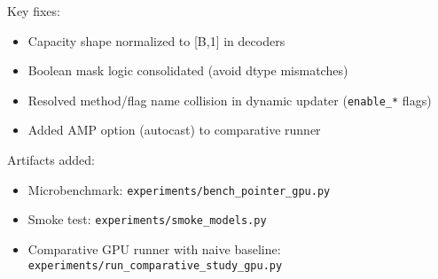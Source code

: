 \documentclass[11pt]{article}
\begin{document}
Key fixes:
\begin{itemize}[noitemsep]
  \item Capacity shape normalized to [B,1] in decoders
  \item Boolean mask logic consolidated (avoid dtype mismatches)
  \item Resolved method/flag name collision in dynamic updater (\texttt{enable\_*} flags)
  \item Added AMP option (autocast) to comparative runner
\end{itemize}

Artifacts added:
\begin{itemize}[noitemsep]
  \item Microbenchmark: \texttt{experiments/bench\_pointer\_gpu.py}
  \item Smoke test: \texttt{experiments/smoke\_models.py}
  \item Comparative GPU runner with naive baseline: \texttt{experiments/run\_comparative\_study\_gpu.py}
\end{itemize}
\end{document}
